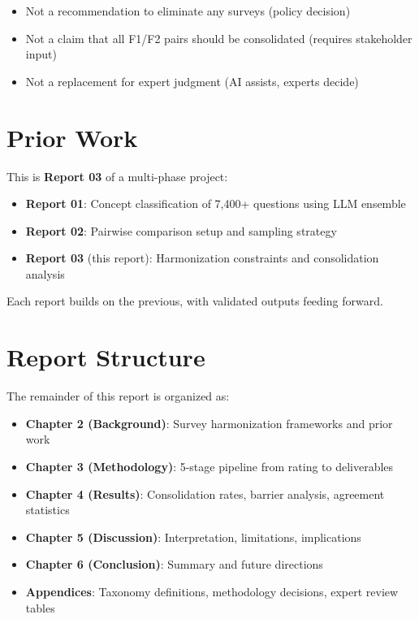 \documentclass[
  letterpaper,
]{report}
\providecommand{\tightlist}{%
  \setlength{\itemsep}{0pt}\setlength{\parskip}{0pt}}
\begin{document}
\begin{itemize}
\tightlist
\item
  Not a recommendation to eliminate any surveys (policy decision)
\item
  Not a claim that all F1/F2 pairs should be consolidated (requires
  stakeholder input)
\item
  Not a replacement for expert judgment (AI assists, experts decide)
\end{itemize}

\section{Prior Work}\label{prior-work}

This is \textbf{Report 03} of a multi-phase project:

\begin{itemize}
\tightlist
\item
  \textbf{Report 01}: Concept classification of 7,400+ questions using
  LLM ensemble
\item
  \textbf{Report 02}: Pairwise comparison setup and sampling strategy
\item
  \textbf{Report 03} (this report): Harmonization constraints and
  consolidation analysis
\end{itemize}

Each report builds on the previous, with validated outputs feeding
forward.

\section{Report Structure}\label{report-structure-1}

The remainder of this report is organized as:

\begin{itemize}
\tightlist
\item
  \textbf{Chapter 2 (Background)}: Survey harmonization frameworks and
  prior work
\item
  \textbf{Chapter 3 (Methodology)}: 5-stage pipeline from rating to
  deliverables
\item
  \textbf{Chapter 4 (Results)}: Consolidation rates, barrier analysis,
  agreement statistics
\item
  \textbf{Chapter 5 (Discussion)}: Interpretation, limitations,
  implications
\item
  \textbf{Chapter 6 (Conclusion)}: Summary and future directions
\item
  \textbf{Appendices}: Taxonomy definitions, methodology decisions,
  expert review tables
\end{itemize}
\end{document}
